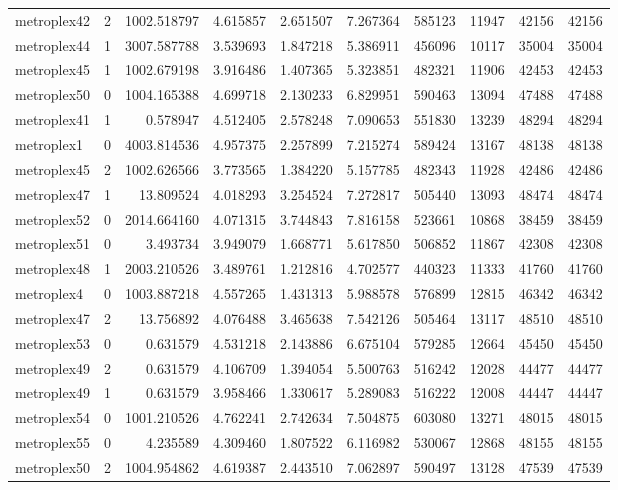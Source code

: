 \begin{longtable}{|l|r|r|r|r|r|r|r|r|r|}
metroplex42 & 2 & 1002.518797 & 4.615857 & 2.651507 & 7.267364 & 585123 & 11947 & 42156 & 42156 \\
metroplex44 & 1 & 3007.587788 & 3.539693 & 1.847218 & 5.386911 & 456096 & 10117 & 35004 & 35004 \\
metroplex45 & 1 & 1002.679198 & 3.916486 & 1.407365 & 5.323851 & 482321 & 11906 & 42453 & 42453 \\
metroplex50 & 0 & 1004.165388 & 4.699718 & 2.130233 & 6.829951 & 590463 & 13094 & 47488 & 47488 \\
metroplex41 & 1 & 0.578947 & 4.512405 & 2.578248 & 7.090653 & 551830 & 13239 & 48294 & 48294 \\
metroplex1 & 0 & 4003.814536 & 4.957375 & 2.257899 & 7.215274 & 589424 & 13167 & 48138 & 48138 \\
metroplex45 & 2 & 1002.626566 & 3.773565 & 1.384220 & 5.157785 & 482343 & 11928 & 42486 & 42486 \\
metroplex47 & 1 & 13.809524 & 4.018293 & 3.254524 & 7.272817 & 505440 & 13093 & 48474 & 48474 \\
metroplex52 & 0 & 2014.664160 & 4.071315 & 3.744843 & 7.816158 & 523661 & 10868 & 38459 & 38459 \\
metroplex51 & 0 & 3.493734 & 3.949079 & 1.668771 & 5.617850 & 506852 & 11867 & 42308 & 42308 \\
metroplex48 & 1 & 2003.210526 & 3.489761 & 1.212816 & 4.702577 & 440323 & 11333 & 41760 & 41760 \\
metroplex4 & 0 & 1003.887218 & 4.557265 & 1.431313 & 5.988578 & 576899 & 12815 & 46342 & 46342 \\
metroplex47 & 2 & 13.756892 & 4.076488 & 3.465638 & 7.542126 & 505464 & 13117 & 48510 & 48510 \\
metroplex53 & 0 & 0.631579 & 4.531218 & 2.143886 & 6.675104 & 579285 & 12664 & 45450 & 45450 \\
metroplex49 & 2 & 0.631579 & 4.106709 & 1.394054 & 5.500763 & 516242 & 12028 & 44477 & 44477 \\
metroplex49 & 1 & 0.631579 & 3.958466 & 1.330617 & 5.289083 & 516222 & 12008 & 44447 & 44447 \\
metroplex54 & 0 & 1001.210526 & 4.762241 & 2.742634 & 7.504875 & 603080 & 13271 & 48015 & 48015 \\
metroplex55 & 0 & 4.235589 & 4.309460 & 1.807522 & 6.116982 & 530067 & 12868 & 48155 & 48155 \\
metroplex50 & 2 & 1004.954862 & 4.619387 & 2.443510 & 7.062897 & 590497 & 13128 & 47539 & 47539 \\

\end{longtable}
